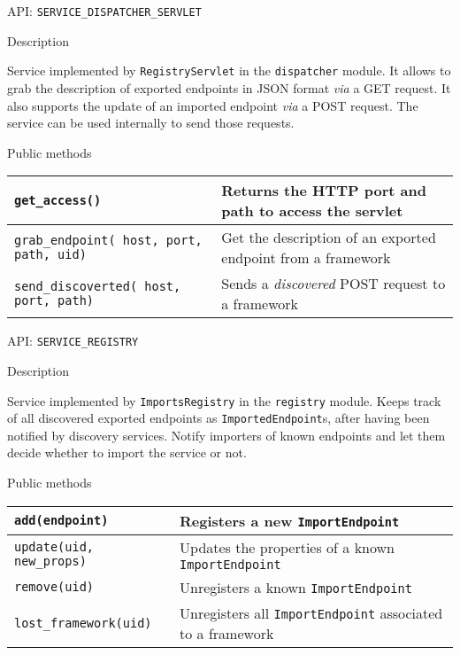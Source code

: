 \begin{frame}{API: \texttt{SERVICE\_DISPATCHER\_SERVLET}}
\begin{block}{Description}
\begin{small}
Service implemented by \texttt{RegistryServlet} in the \texttt{dispatcher} module.
It allows to grab the description of exported endpoints in JSON format \textit{via} a GET request.
It also supports the update of an imported endpoint \textit{via} a POST request.
The service can be used internally to send those requests.
\end{small}
\end{block}

\begin{block}{Public methods}
\begin{small}
\begin{tabular}{p{} p{}}
\texttt{get\_access()} & Returns the HTTP port and path to access the servlet \\
\hline
\texttt{grab\_endpoint( host, port, path, uid)} & Get the description of an exported endpoint from a framework\\
\hline
\texttt{send\_discoverted( host, port, path)} & Sends a \textit{discovered} POST request to a framework \\
\end{tabular}
\end{small}
\end{block}
\end{frame}

\begin{frame}{API: \texttt{SERVICE\_REGISTRY}}
\begin{block}{Description}
\begin{small}
Service implemented by \texttt{ImportsRegistry} in the \texttt{registry} module.
Keeps track of all discovered exported endpoints as \texttt{ImportedEndpoint}s, after having been notified by discovery services.
Notify importers of known endpoints and let them decide whether to import the service or not.
\end{small}
\end{block}

\begin{block}{Public methods}
\begin{small}
\begin{tabular}{lp{}}
\texttt{add(endpoint)} & Registers a new \texttt{ImportEndpoint} \\
\hline
\texttt{update(uid, new\_props)} & Updates the properties of a known \texttt{ImportEndpoint}\\
\hline
\texttt{remove(uid)} & Unregisters a known \texttt{ImportEndpoint}\\
\hline
\texttt{lost\_framework(uid)} & Unregisters all \texttt{ImportEndpoint} associated to a framework\\
\end{tabular}
\end{small}
\end{block}
\end{frame}
